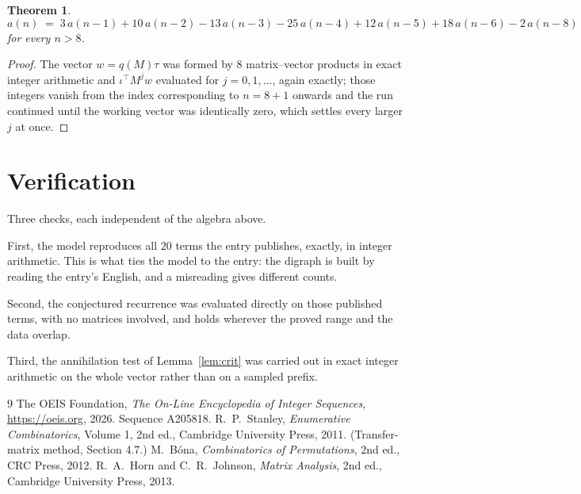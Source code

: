 \documentclass[11pt,a4paper]{article}
\theoremstyle{plain}
\newtheorem{theorem}{Theorem}
\theoremstyle{definition}
\begin{document}
\begin{theorem}
\[
a(n)\;=\;3\,a(n-1) + 10\,a(n-2) - 13\,a(n-3) - 25\,a(n-4) + 12\,a(n-5) + 18\,a(n-6) - 2\,a(n-8)
\]
for every $n>8$.
\end{theorem}

\begin{proof}
The vector $w=q(M)\tau$ was formed by $8$ matrix--vector products in exact integer
arithmetic and $\iota^{\!\top}M^{j}w$ evaluated for $j=0,1,\dots$, again exactly; those
integers vanish from the index corresponding to $n=8+1$ onwards and the run continued
until the working vector was identically zero, which settles every larger $j$ at once.
\end{proof}

\section{Verification}

Three checks, each independent of the algebra above.

First, the model reproduces all $20$ terms the entry publishes, exactly, in integer
arithmetic. This is what ties the model to the entry: the digraph is built by reading the
entry's English, and a misreading gives different counts.

Second, the conjectured recurrence was evaluated directly on those published terms, with no
matrices involved, and holds wherever the proved range and the data overlap.

Third, the annihilation test of Lemma~\ref{lem:crit} was carried out in exact integer
arithmetic on the whole vector rather than on a sampled prefix.

\begin{thebibliography}{9}
 The OEIS Foundation, \emph{The On-Line Encyclopedia of Integer
Sequences}, \url{https://oeis.org}, 2026. Sequence A205818.
 R.~P.~Stanley, \emph{Enumerative Combinatorics}, Volume 1, 2nd ed.,
Cambridge University Press, 2011. (Transfer-matrix method, Section 4.7.)
 M.~B\'ona, \emph{Combinatorics of Permutations}, 2nd ed., CRC
Press, 2012.
 R.~A.~Horn and C.~R.~Johnson, \emph{Matrix Analysis}, 2nd ed., Cambridge
University Press, 2013.
\end{thebibliography}
\end{document}
